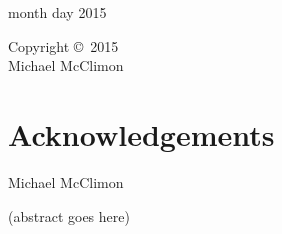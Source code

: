 {\flushleft
month day 2015
}

\clearpage

\begin{center}
  \vspace*{\fill}
  Copyright \copyright\ 2015 \\
  Michael McClimon
  \vspace*{\fill}
\end{center}
\clearpage


\section*{\Large Acknowledgements}

\clearpage


{}
\begin{center}
  Michael McClimon \\
  \vspace{0.5\baselineskip}
  {
    \MakeUppercase{\Title}
  }
\end{center}

\doublespacing
(abstract goes here)

